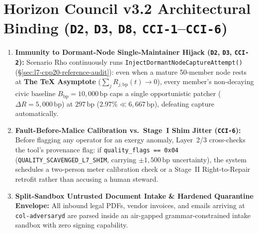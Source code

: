 \section{Horizon Council v3.2 Architectural Binding (\texttt{D2}, \texttt{D3}, \texttt{D8}, \texttt{CCI-1}--\texttt{CCI-6})}
\begin{enumerate}
    \item \textbf{Immunity to Dormant-Node Single-Maintainer Hijack (\texttt{D2}, \texttt{D3}, \texttt{CCI-2}):} Scenario Rho continuously runs \texttt{InjectDormantNodeCaptureAttempt()} (\S\ref{sec:l7-cpp20-reference-audit}): even when a mature 50-member node rests at \textbf{The \TeX{} Asymptote} ($\sum_j R_{j,\mathrm{bp}}(t) \to 0$), every member's non-decaying civic baseline $B_{\mathrm{bp}} = 10{,}000\,\mathrm{bp}$ caps a single opportunistic patcher ($\Delta R = 5{,}000\,\mathrm{bp}$) at $297\,\mathrm{bp}$ ($2.97\% \ll 6{,}667\,\mathrm{bp}$), defeating capture automatically.
    \item \textbf{Fault-Before-Malice Calibration vs.\ Stage~I Shim Jitter (\texttt{CCI-6}):} Before flagging any operator for an exergy anomaly, Layer~2/3 cross-checks the tool's provenance flag: if \texttt{quality\_flags == 0x04} (\texttt{QUALITY\_SCAVENGED\_L7\_SHIM}, carrying $\pm 1{,}500\,\mathrm{bp}$ uncertainty), the system schedules a two-person meter calibration check or a Stage~II Right-to-Repair retrofit rather than accusing a human steward.
    \item \textbf{Split-Sandbox Untrusted Document Intake \& Hardened Quarantine Envelope:} All inbound legal PDFs, vendor invoices, and emails arriving at \texttt{col-adversaryd} are parsed inside an air-gapped grammar-constrained intake sandbox with zero signing capability.
\end{enumerate}

